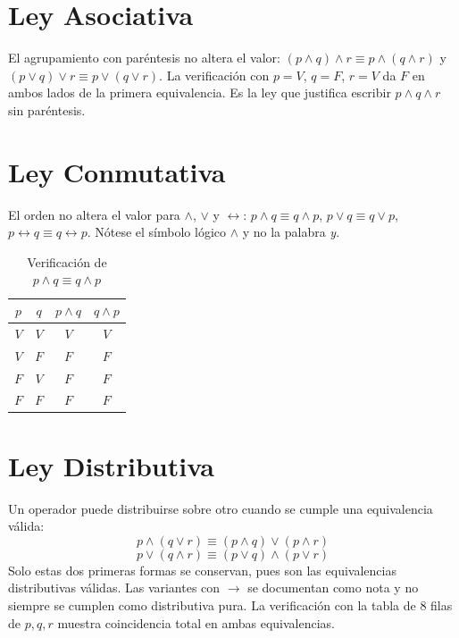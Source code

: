 \documentclass[11pt,a4paper,openany]{book}
\begin{document}
\section{Ley Asociativa}
El agrupamiento con par\'entesis no altera el valor: $(p \land q) \land r \equiv p \land (q \land r)$ y $(p \lor q) \lor r \equiv p \lor (q \lor r)$. La verificaci\'on con $p = V$, $q = F$, $r = V$ da $F$ en ambos lados de la primera equivalencia. Es la ley que justifica escribir $p \land q \land r$ sin par\'entesis.

\section{Ley Conmutativa}
El orden no altera el valor para $\land$, $\lor$ y $\leftrightarrow$: $p \land q \equiv q \land p$, $p \lor q \equiv q \lor p$, $p \leftrightarrow q \equiv q \leftrightarrow p$. N\'otese el s\'imbolo l\'ogico $\land$ y no la palabra \textit{y}.
\begin{table}[H]
\centering
\caption{Verificaci\'on de $p \land q \equiv q \land p$}
\begin{tabular}{cc|c|c}
\toprule
$p$ & $q$ & $p \land q$ & $q \land p$ \\
\midrule
$V$ & $V$ & $V$ & $V$ \\
$V$ & $F$ & $F$ & $F$ \\
$F$ & $V$ & $F$ & $F$ \\
$F$ & $F$ & $F$ & $F$ \\
\bottomrule
\end{tabular}
\end{table}

\section{Ley Distributiva}
Un operador puede distribuirse sobre otro cuando se cumple una equivalencia v\'alida:
\begin{equation}
p \land (q \lor r) \equiv (p \land q) \lor (p \land r)
\end{equation}
\begin{equation}
p \lor (q \land r) \equiv (p \lor q) \land (p \lor r)
\end{equation}
Solo estas dos primeras formas se conservan, pues son las equivalencias distributivas v\'alidas. Las variantes con $\to$ se documentan como nota y no siempre se cumplen como distributiva pura. La verificaci\'on con la tabla de 8 filas de $p,q,r$ muestra coincidencia total en ambas equivalencias.
\end{document}

